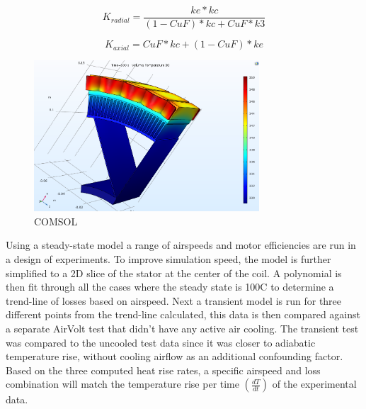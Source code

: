\documentclass[]{aiaa-tc}%
\begin{document}
\begin{equation}
K_{radial} = \frac{ke*kc}{(1-CuF)*kc + CuF*k3}
\label{eq:kradial}
\end{equation}

\begin{equation}
K_{axial} = CuF*kc + (1-CuF)*ke
\label{eq:kradial}
\end{equation}

\begin{figure}[!htb]%
	\centering
	\includegraphics[width=0.75\textwidth]{figures/jmx57_motor_comsol.png}
	\caption{COMSOL}
	\label{fig:comsol}
\end{figure}

Using a steady-state model a range of airspeeds and motor efficiencies are run in a design of experiments. To improve simulation speed, the model is further simplified to a 2D slice of the stator at the center of the coil. A polynomial is then fit through all the cases where the steady state is 100C to determine a trend-line of losses based on airspeed.
Next a transient model is run for three different points from the trend-line calculated, this data is then compared against a separate AirVolt test that didn't have any active air cooling. The transient test was compared to the uncooled test data since it was closer to adiabatic temperature rise, without cooling airflow as an additional confounding factor. Based on the three computed heat rise rates, a specific airspeed and loss combination will match the temperature rise per time $(\frac{dT}{dt})$ of the experimental data.
\end{document}
